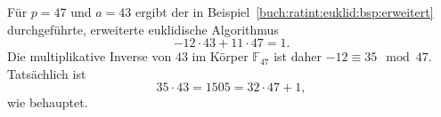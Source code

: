 \begin{beispiel}
Für $p=47$ und $a=43$ ergibt der in
Beispiel~\ref{buch:ratint:euklid:bsp:erweitert}
durchgeführte, erweiterte euklidische Algorithmus
\[
-12 \cdot 43
+
11\cdot 47
= 1.
\]
Die multiplikative Inverse von $43$ im Körper $\mathbb{F}_{47}$ ist
daher $-12\equiv 35\mod 47$.
%
Tatsächlich ist 
\[
35\cdot 43 = 1505 = 32\cdot 47 + 1,
\]
wie behauptet.
\end{beispiel}

